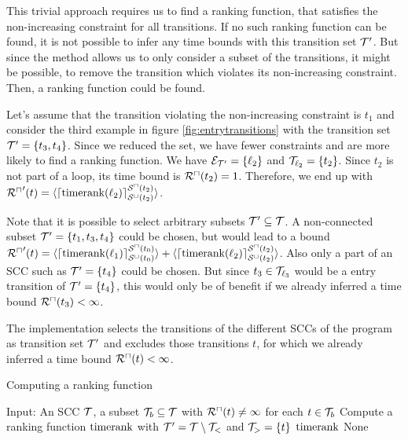 This trivial approach requires us to find a ranking function, that satisfies the non-increasing constraint for all transitions.
If no such ranking function can be found, it is not possible to infer any time bounds with this transition set $\mathcal{T}'$.
But since the method allows us to only consider a subset of the transitions, it might be possible, to remove the transition which violates its non-increasing constraint.
Then, a ranking function could be found.

Let's assume that the transition violating the non-increasing constraint is $t_1$ and consider the third example in figure \ref{fig:entrytransitions} with the transition set $\mathcal{T}' = \lbrace t_3, t_4 \rbrace$.
Since we reduced the set, we have fewer constraints and are more likely to find a ranking function.
We have $\mathcal{E}_{\mathcal{T}'} = \lbrace \ell_2 \rbrace$ and $\mathcal{T}_{\ell_2} = \lbrace t_2 \rbrace$.
Since $t_2$ is not part of a loop, its time bound is ${\mathcal{R}^\sqcap}(t_2) = 1$.
Therefore, we end up with ${\mathcal{R}^\sqcap}'(t) = \langle\lceil \text{timerank}(\ell_2) \rceil^{{\mathcal{S}^\sqcap}(t_2)}_{{\mathcal{S}^\sqcup}(t_2)}\rangle$.

Note that it is possible to select arbitrary subsets $\mathcal{T}' \subseteq \mathcal{T}$.
A non-connected subset $\mathcal{T}' = \lbrace t_1, t_3, t_4 \rbrace$ could be chosen, but would lead to a bound ${\mathcal{R}^\sqcap}'(t) = \langle\lceil \text{timerank}(\ell_1) \rceil^{{\mathcal{S}^\sqcap}(t_0)}_{{\mathcal{S}^\sqcup}(t_0)}\rangle + \langle\lceil \text{timerank}(\ell_2) \rceil^{{\mathcal{S}^\sqcap}(t_2)}_{{\mathcal{S}^\sqcup}(t_2)}\rangle$.
Also only a part of an SCC such as $\mathcal{T}' = \lbrace t_4 \rbrace$ could be chosen.
But since $t_3 \in \mathcal{T}_{\ell_3}$ would be a entry transition of $\mathcal{T}' = \lbrace t_4 \rbrace$, this would only be of benefit if we already inferred a time bound ${\mathcal{R}^\sqcap}(t_3) < \infty$.

The implementation selects the transitions of the different SCCs of the program as transition set $\mathcal{T}'$ and excludes those transitions $t$, for which we already inferred a time bound ${\mathcal{R}^\sqcap}(t) < \infty$.


\begin{algorithm}
\caption{Computing a ranking function}\label{ranking_function_algorithm}
\begin{algorithmic}[1]
  \State Input: An SCC $\mathcal{T}$, a subset $\mathcal{T}_b \subseteq \mathcal{T}$ with ${\mathcal{R}^\sqcap}(t) \neq \infty$ for each $t \in \mathcal{T}_b$
        \State Compute a ranking function $\text{timerank}$ with $\mathcal{T}' = \mathcal{T} \setminus \mathcal{T}_<$ and $\mathcal{T}_> = \lbrace t \rbrace$
          \Return $\text{timerank}$
        \EndIf
      \EndFor
    \EndFor
  \EndFor
  \Return None
\end{algorithmic}
\end{algorithm}

